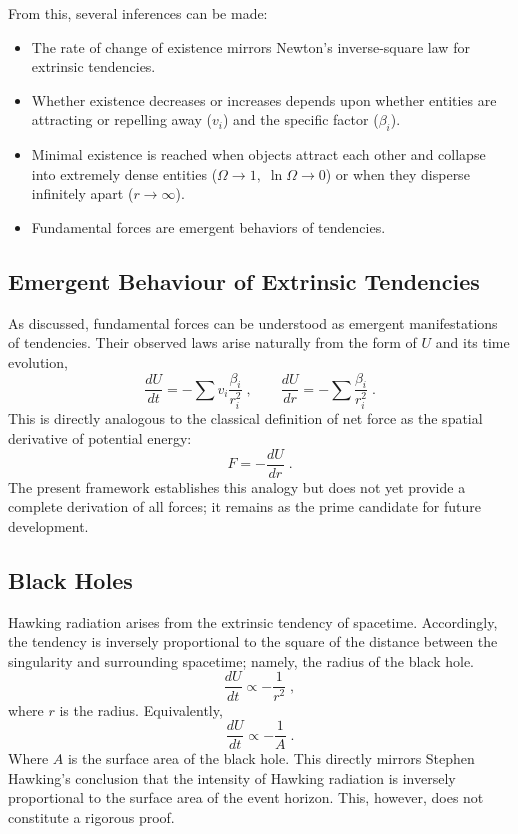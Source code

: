 \documentclass{article}
\begin{document}
From this, several inferences can be made:

\begin{itemize}
    \item The rate of change of existence mirrors Newton's inverse-square law for extrinsic tendencies.
    \item Whether existence decreases or increases depends upon whether entities are attracting or repelling away ($v_{i}$) and the specific factor ($\beta_{i}$).
    \item Minimal existence is reached when objects attract each other and collapse into extremely dense entities ($ \Omega \rightarrow 1,\; \ln \Omega \rightarrow 0$) or when they disperse infinitely apart ($r \rightarrow \infty$).
    \item Fundamental forces are emergent behaviors of tendencies.
\end{itemize}


\subsection{Emergent Behaviour of Extrinsic Tendencies}

As discussed, fundamental forces can be understood as emergent manifestations of tendencies.
Their observed laws arise naturally from the form of $U$ and its time evolution,
\[
    \frac{dU}{dt} = -\sum v_{i}\frac{\beta_{i}}{r_{i}^2}\;,
    \qquad
    \frac{dU}{dr} = -\sum \frac{\beta_{i}}{r_{i}^2}\;.
\]
This is directly analogous to the classical definition of net force as the spatial derivative of potential energy:
\[
    F = -\frac{dU}{dr}\;.
\]
The present framework establishes this analogy but does not yet provide a complete derivation of all forces; it remains as the prime candidate for future development.


\subsection{Black Holes}

Hawking radiation arises from the extrinsic tendency of spacetime. 
Accordingly, the tendency is inversely proportional to the square of the distance between the singularity and surrounding spacetime; namely, the radius of the black hole.
\[
    \frac{dU}{dt} \propto -\frac{1}{r^2}\;,
\]
where $r$ is the radius. Equivalently,
\[
    \frac{dU}{dt} \propto -\frac{1}{A}\;.
\]
Where $A$ is the surface area of the black hole. 
This directly mirrors Stephen Hawking's conclusion that the intensity of Hawking radiation is inversely proportional to the surface area of the event horizon. This, however, does not constitute a rigorous proof.
\end{document}
